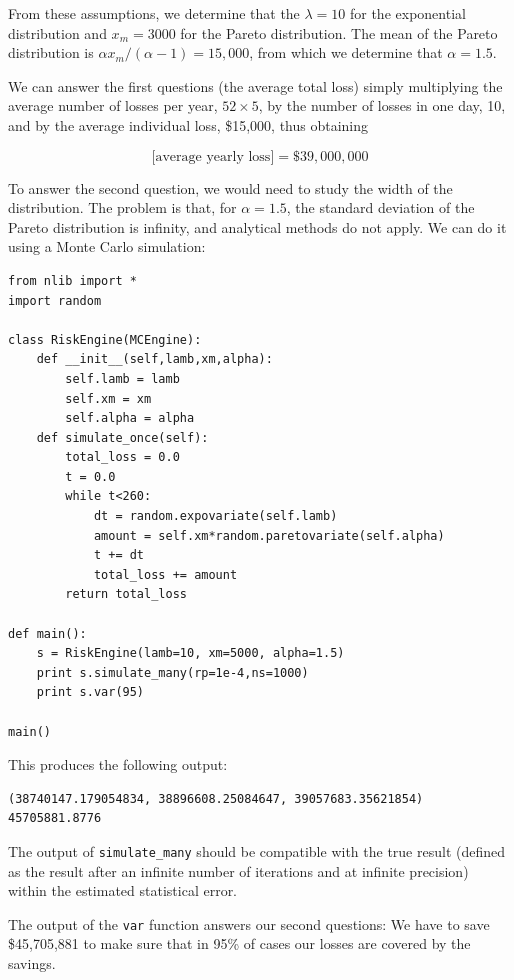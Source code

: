 \documentclass[justified,sixbynine]{tufte-book}
\def\ft{\small\tt}
\theoremstyle{plain}%
\theoremstyle{definition}
\theoremstyle{remark}
\begin{document}
\begin{fullwidth}
From these assumptions, we determine that the $\lambda=10$ for the exponential distribution and $x_m=3000$ for the Pareto distribution. The mean of the Pareto distribution is $\alpha x_m/(\alpha-1) = 15,000$, from which we determine that $\alpha = 1.5$.

We can answer the first questions (the average total loss) simply multiplying the average number of losses per year, $52\times5$, by the number of losses in one day, 10, and by the average individual loss, \$15,000, thus obtaining

\begin{equation}
\textrm{[average yearly loss]} = \$39,000,000
\end{equation}

To answer the second question, we would need to study the width of the distribution. The problem is that, for $\alpha=1.5$, the standard deviation of the Pareto distribution is infinity, and analytical methods do not apply. We can do it using a Monte Carlo simulation:


\begin{lstlisting}[caption={in file: {\ft risk.py}}]
from nlib import *
import random

class RiskEngine(MCEngine):
    def __init__(self,lamb,xm,alpha):
        self.lamb = lamb
        self.xm = xm
        self.alpha = alpha
    def simulate_once(self):
        total_loss = 0.0
        t = 0.0
        while t<260:
            dt = random.expovariate(self.lamb)
            amount = self.xm*random.paretovariate(self.alpha)
            t += dt
            total_loss += amount
        return total_loss

def main():
    s = RiskEngine(lamb=10, xm=5000, alpha=1.5)
    print s.simulate_many(rp=1e-4,ns=1000)
    print s.var(95)

main()
\end{lstlisting}

This produces the following output:

\begin{lstlisting}
(38740147.179054834, 38896608.25084647, 39057683.35621854)
45705881.8776
\end{lstlisting}

The output of {\ft simulate\_many} should be compatible with the true result (defined as the result after an infinite number of iterations and at infinite precision) within the estimated statistical error.

The output of the {\ft var} function answers our second questions: We have to save \$45,705,881 to make sure that in 95\% of cases our losses are covered by the savings.



\end{fullwidth}
\end{document}
